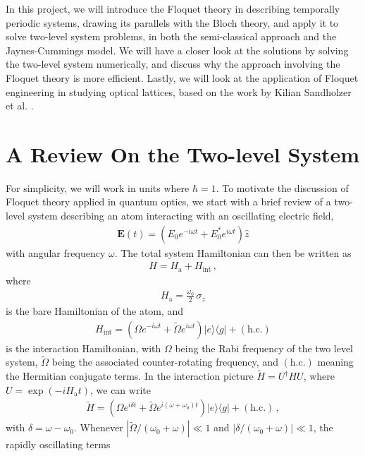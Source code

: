 \documentclass[reprint, amsmath, amssymb, aps]{revtex4-2}
\newcommand{\that}[1]{\widetilde{#1}}
\begin{document}
In this project, we will introduce the Floquet theory in describing temporally periodic systems, drawing its parallels with the Bloch theory, and apply it to solve two-level system problems, in both the semi-classical approach and the Jaynes-Cummings model. We will have a closer look at the solutions by solving the two-level system numerically, and discuss why the approach involving the Floquet theory is more efficient. Lastly, we will look at the application of Floquet engineering in studying optical lattices, based on the work by Kilian Sandholzer et al. \cite{Sandholzer}.


\section{\label{sec:level1}A Review On the Two-level System}
For simplicity, we will work in units where $\hbar = 1$. To motivate the discussion of Floquet theory applied in quantum optics, we start with a brief review of a two-level system describing an atom interacting with an oscillating electric field, 
\begin{align}
\mathbf{E}(t) = (E_0 e^{-i\omega t} + E_0^*e^{i\omega t})\hat{z}
\end{align}
with angular frequency $\omega$. The total system Hamiltonian can then be written as
\begin{align}
H = H_{\text{a}} + H_{\text{int}}\,,
\end{align}
where
\begin{align}
H_{\text{a}} = \frac{\omega_0}{2}\, \sigma_z 
\end{align}
is the bare Hamiltonian of the atom, and 
\begin{align}
H_{\text{int}}  =  (\Omega e^{-i\omega t}+ \that{\Omega} e^{i\omega t} ) |e\rangle\langle g| + (\text{h.c.})
\end{align}
is the interaction Hamiltonian, with $\Omega$ being the Rabi frequency of the two level system, $\that{\Omega}$ being the associated counter-rotating frequency, and $(\text{h.c.})$ meaning the Hermitian conjugate terms. In the interaction picture $\that{H} = U^\dagger H U$, where $U = \exp(-iH_\text{a}t)$, we can write
\begin{align}
\that{H} =  \left(\Omega e^{i\delta t} + \that{\Omega} e^{i(\omega+ \omega_0) t}\right) |e\rangle\langle g| + (\text{h.c.})\,, 
\end{align} 
with $\delta = \omega  - \omega_0$. Whenever $|\that{\Omega}/(\omega_0+\omega)| \ll 1$ and $|\delta /(\omega_0+\omega)|\ll 1$, the rapidly oscillating terms
\end{document}
